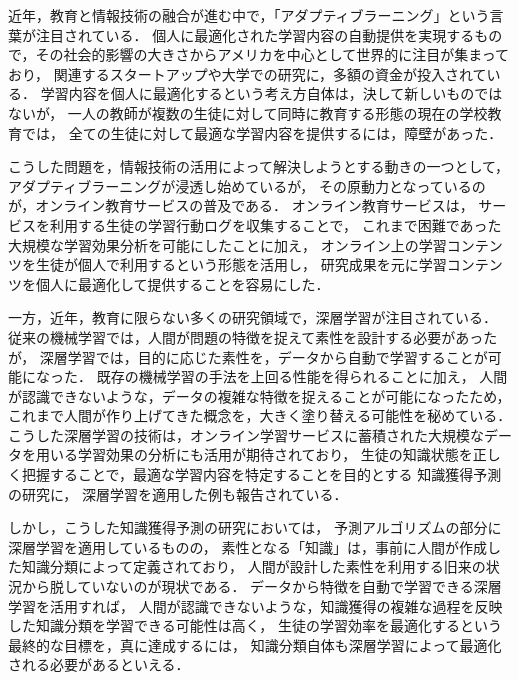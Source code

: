 近年，教育と情報技術の融合が進む中で，「アダプティブラーニング」という言葉が注目されている．
個人に最適化された学習内容の自動提供を実現するもので，その社会的影響の大きさからアメリカを中心として世界的に注目が集まっており，
関連するスタートアップや大学での研究に，多額の資金が投入されている．
学習内容を個人に最適化するという考え方自体は，決して新しいものではないが，
一人の教師が複数の生徒に対して同時に教育する形態の現在の学校教育では，
全ての生徒に対して最適な学習内容を提供するには，障壁があった．


こうした問題を，情報技術の活用によって解決しようとする動きの一つとして，アダプティブラーニングが浸透し始めているが，
その原動力となっているのが，オンライン教育サービスの普及である．
オンライン教育サービスは，
サービスを利用する生徒の学習行動ログを収集することで，
これまで困難であった大規模な学習効果分析を可能にしたことに加え，
オンライン上の学習コンテンツを生徒が個人で利用するという形態を活用し，
研究成果を元に学習コンテンツを個人に最適化して提供することを容易にした．


一方，近年，教育に限らない多くの研究領域で，深層学習が注目されている．
従来の機械学習では，人間が問題の特徴を捉えて素性を設計する必要があったが，
深層学習では，目的に応じた素性を，データから自動で学習することが可能になった．
既存の機械学習の手法を上回る性能を得られることに加え，
人間が認識できないような，データの複雑な特徴を捉えることが可能になったため，
これまで人間が作り上げてきた概念を，大きく塗り替える可能性を秘めている．
こうした深層学習の技術は，オンライン学習サービスに蓄積された大規模なデータを用いる学習効果の分析にも活用が期待されており，
生徒の知識状態を正しく把握することで，最適な学習内容を特定することを目的とする
知識獲得予測の研究に，
深層学習を適用した例も報告されている．

しかし，こうした知識獲得予測の研究においては，
予測アルゴリズムの部分に深層学習を適用しているものの，
素性となる「知識」は，事前に人間が作成した知識分類によって定義されており，
人間が設計した素性を利用する旧来の状況から脱していないのが現状である．
データから特徴を自動で学習できる深層学習を活用すれば，
人間が認識できないような，知識獲得の複雑な過程を反映した知識分類を学習できる可能性は高く，
生徒の学習効率を最適化するという最終的な目標を，真に達成するには，
知識分類自体も深層学習によって最適化される必要があるといえる．


